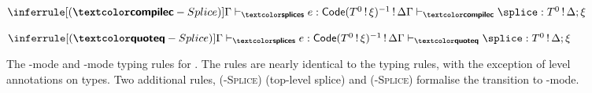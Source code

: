\begin{figure}
\begin{source-desc}
\begin{center}
\vspace{5mm}

\begin{minipage}[t]{0.5\textwidth}
  \centering
  $\inferrule[(\compilemode{}-Splice)]{\stypejudge[\Gamma]{e}{\textsf{Code}(T^0 \, ! \, \xi)^{-1} \, ! \, \Delta}}{\ctypejudge{\splice}{\runtimecomptype{T}{\Delta ; \xi}}}$
\end{minipage}%
\begin{minipage}[t]{0.5\textwidth}
  \centering
  $\inferrule[(\quotemode{}-Splice)]{\stypejudge[\Gamma]{e}{\textsf{Code}(T^0 \, ! \, \xi)^{-1} \, ! \, \Delta}}{\qtypejudge{\splice}{\runtimecomptype{T}{\Delta ; \xi}}}$
\end{minipage}

\end{center}
\end{source-desc}
\caption{The \compilemode{}-mode and \quotemode{}-mode typing rules for \sourceLang{}. The rules are nearly identical to the \efflang{} typing rules, with the exception of level annotations on types. Two additional rules, \textsc{(\compilemode{}-Splice)} (top-level splice) and \textsc{(\quotemode{}-Splice)} formalise the transition to \splicemode{}-mode.}%
\label{fig:source-cq-typing-rules}
\end{figure}

